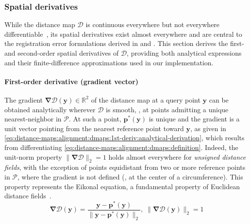 \subsubsection{Spatial derivatives}
\label{sec:distance-maps:alignment:dmaps:derivation}

While the distance map $\mathcal{D}$ is continuous everywhere but not everywhere
differentiable~\cite{jones:tvcg:2006}, its spatial derivatives
exist almost everywhere and are central to the registration error formulations
derived in  and
.
This section derives the first- and second-order spatial derivatives
of $\mathcal{D}$, providing both analytical expressions and their
finite-difference approximations used in our implementation.

\paragraph{First-order derivative (gradient vector)}
The gradient $\bm{\nabla}\mathcal{D}(\mathbf{y}) \in \mathbb{R}^2$ of the
distance map at a query point $\mathbf{y}$ can be obtained analytically
wherever $\mathcal{D}$ is smooth, \ie, at points admitting a unique
nearest-neighbor in $\mathcal{P}$. At such a point,
$\mathbf{p}^*(\mathbf{y})$ is unique and the gradient is a unit vector pointing
from the nearest reference point toward $\mathbf{y}$, as given in
\eqref{eq:distance-maps:alignment:dmaps:1st-deriv:analytical-derivation},
which results from differentiating
\eqref{eq:distance-maps:alignment:dmaps:definition}.
Indeed, the unit-norm property $\|\bm{\nabla}\mathcal{D}\|_2 = 1$ holds
almost everywhere for \emph{unsigned distance fields},
with the exception of points equidistant from two or more reference points in
$\mathcal{P}$, where the gradient is not defined
(\eg, at the center of a circumference).
This property represents the Eikonal equation, a fundamental property
of Euclidean distance fields~\cite{jones:tvcg:2006}.
\begin{equation}
\label{eq:distance-maps:alignment:dmaps:1st-deriv:analytical-derivation}
\bm{\nabla}\mathcal{D}(\mathbf{y}) =
\frac{\mathbf{y} - \mathbf{p}^*(\mathbf{y})}
    {\|\mathbf{y} - \mathbf{p}^*(\mathbf{y})\|_2},
\; \|\bm{\nabla}\mathcal{D}(\mathbf{y})\|_2 = 1
\end{equation}

